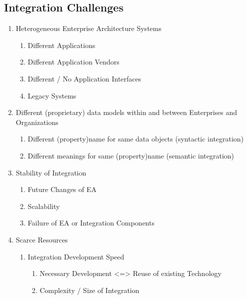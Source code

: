 \documentclass[
     12pt,         %
     a4paper,      %
     BCOR10mm,     %
     DIV14,        %
     ]{scrreprt}
\begin{document}
\subsection{Integration Challenges}
\begin{enumerate}
     \item Heterogeneous Enterprise Architecture Systems
           \begin{enumerate}
                \item Different Applications
                \item Different Application Vendors
                \item Different / No Application Interfaces
                \item Legacy Systems
           \end{enumerate}

     \item Different (proprietary) data models within and between Enterprises and Organizations
           \begin{enumerate}
                \item Different (property)name for same data objects (syntactic integration)
                \item Different meanings for same (property)name (semantic integration)
           \end{enumerate}

     \item Stability of Integration
           \begin{enumerate}
                \item Future Changes of EA
                \item Scalability
                \item Failure of EA or Integration Components
           \end{enumerate}

     \item Scarce Resources
           \begin{enumerate}
                \item Integration Development Speed
                      \begin{enumerate}
                           \item Necessary Development <=> Reuse of existing Technology
                           \item Complexity / Size of Integration
                      \end{enumerate}


\end{enumerate}
\end{enumerate}
\end{document}
